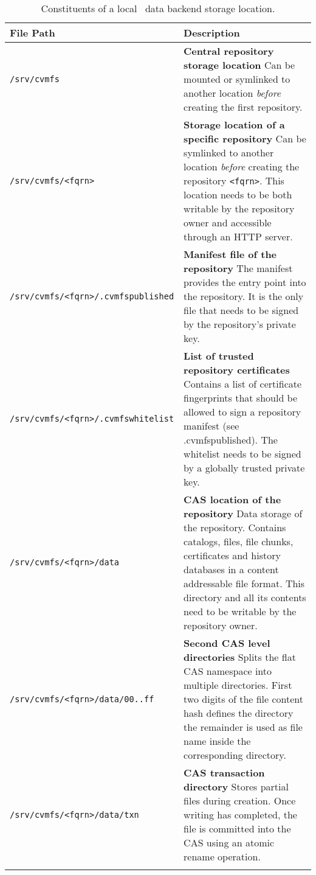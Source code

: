 \begin{longtable}{lX}
	\toprule
	{\bf\centering File Path} & {\bf\centering Description} \\
	\midrule

	\texttt{/srv/cvmfs} & \textbf{Central repository storage location} \newline
	Can be mounted or symlinked to another location \emph{before} creating the first repository. \\
	\addlinespace

	\texttt{/srv/cvmfs/<fqrn>} & \textbf{Storage location of a specific repository} \newline
	Can be symlinked to another location \emph{before} creating the repository \texttt{<fqrn>}. This location needs to be both writable by the repository owner and accessible through an HTTP server. \\
	\addlinespace

	\texttt{/srv/cvmfs/<fqrn>/.cvmfspublished} & \textbf{Manifest file of the repository} \newline
	The manifest provides the entry point into the repository. It is the only file that needs to be signed by the repository's private key. \\
	\addlinespace

	\texttt{/srv/cvmfs/<fqrn>/.cvmfswhitelist} & \textbf{List of trusted repository certificates} \newline
	Contains a list of certificate fingerprints that should be allowed to sign a repository manifest (see .cvmfspublished). The whitelist needs to be signed by a globally trusted private key.\\
	\addlinespace

	\texttt{/srv/cvmfs/<fqrn>/data} & \textbf{CAS location of the repository} \newline
    Data storage of the repository. Contains catalogs, files, file chunks, certificates and history databases in a content addressable file format. This directory and all its contents need to be writable by the repository owner.\\
	\addlinespace

	\texttt{/srv/cvmfs/<fqrn>/data/00..ff} & \textbf{Second CAS level directories} \newline
	Splits the flat CAS namespace into multiple directories. First two digits of the file content hash defines the directory the remainder is used as file name inside the corresponding directory.\\
	\addlinespace

	\texttt{/srv/cvmfs/<fqrn>/data/txn} & \textbf{CAS transaction directory} \newline
	Stores partial files during creation. Once writing has completed, the file is committed into the CAS using an atomic rename operation. \\
	\addlinespace

	\bottomrule
	\caption{Constituents of a local \cvmfs\ data backend storage location.}
	\label{tbl:localbackendanatomy}
\end{longtable}
